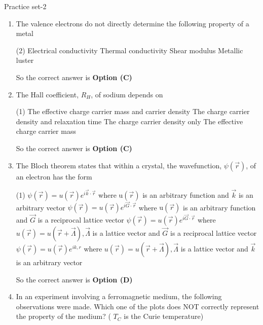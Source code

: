 \newpage
\begin{abox}
	Practice set-2
\end{abox}
\begin{enumerate}
	\item The valence electrons do not directly determine the following property of a metal
	{	}
	\begin{tasks}(2)
		\task[\textbf{A.}] Electrical conductivity
		\task[\textbf{B.}]  Thermal conductivity
		\task[\textbf{C.}] Shear modulus
		\task[\textbf{D.}] Metallic luster
	\end{tasks}
	\begin{answer}
		So the correct answer is \textbf{Option (C)}
	\end{answer}
	\item The Hall coefficient, $R_{H}$, of sodium depends on
	{	}
	\begin{tasks}(1)
		\task[\textbf{A.}]  The effective charge carrier mass and carrier density
		\task[\textbf{B.}] The charge carrier density and relaxation time
		\task[\textbf{C.}]  The charge carrier density only
		\task[\textbf{D.}] The effective charge carrier mass
	\end{tasks}
	\begin{answer}
		So the correct answer is \textbf{Option (C)}
	\end{answer}
	\item  The Bloch theorem states that within a crystal, the wavefunction, $\psi(\vec{r})$, of an electron has the form
	{	}
	\begin{tasks}(1)
		\task[\textbf{A.}]  $\psi(\vec{r})=u(\vec{r}) e^{i \vec{k} \cdot \vec{r}}$ where $\mathrm{u}(\vec{r})$ is an arbitrary function and $\vec{k}$ is an arbitrary vector
		\task[\textbf{B.}]  $\psi(\vec{r})=u(\vec{r}) e^{i \vec{G} \cdot \vec{r}}$ where $\mathrm{u}(\vec{r})$ is an arbitrary function and $\vec{G}$ is a reciprocal lattice vector
		\task[\textbf{C.}]  $\psi(\vec{r})=u(\vec{r}) e^{i \vec{G} \cdot \vec{r}}$ where $u(\vec{r})=u(\vec{r}+\vec{\Lambda}), \vec{\Lambda}$ is a lattice vector and $\vec{G}$ is a reciprocal lattice vector
		\task[\textbf{D.}]  $\psi(\vec{r})=u(\vec{r}) e^{i k, r}$ where $u(\vec{r})=u(\vec{r}+\vec{\Lambda}), \vec{\Lambda}$ is a lattice vector and $\vec{k}$ is an arbitrary vector
	\end{tasks}
	\begin{answer}
		So the correct answer is \textbf{Option (D)}
	\end{answer}
	\item In an experiment involving a ferromagnetic medium, the following observations were made. Which one of the plots does NOT correctly represent the property of the medium? ( $T_{C}$ is the Curie temperature)

\end{enumerate}

